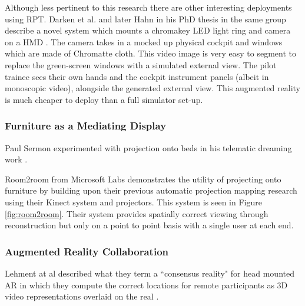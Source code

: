 Although less pertinent to this research there are other interesting deployments using RPT. Darken et al. and later Hahn in his PhD thesis in the same group describe a novel system which mounts a chromakey LED light ring and camera on a HMD \cite{Darken2003}. The camera takes in a mocked up physical cockpit and windows which are made of Chromatte cloth. This video image is very easy to segment to replace the green-screen windows with a simulated external view. The pilot trainee sees their own hands and the cockpit instrument panels (albeit in monoscopic video), alongside the generated external view. This augmented reality is much cheaper to deploy than a full simulator set-up.\par
\subsubsection{Furniture as a Mediating Display}
        Paul Sermon experimented with projection onto beds in his telematic dreaming work \cite{Sermon2000}.\par
Room2room from Microsoft Labs \cite{Pejsa2016} demonstrates the utility of projecting onto furniture by building upon their previous automatic projection mapping research \cite{Jones2014} using their Kinect system and projectors. This system is seen in Figure \ref{fig:room2room}. Their system provides spatially correct viewing through reconstruction but only on a point to point basis with a single user at each end. 

    \subsubsection{Augmented Reality Collaboration}
    Lehment at al described what they term a ``consensus reality" for head mounted AR in which they compute the correct locations for remote participants as 3D video representations overlaid on the real \cite{Lehment2014}.

